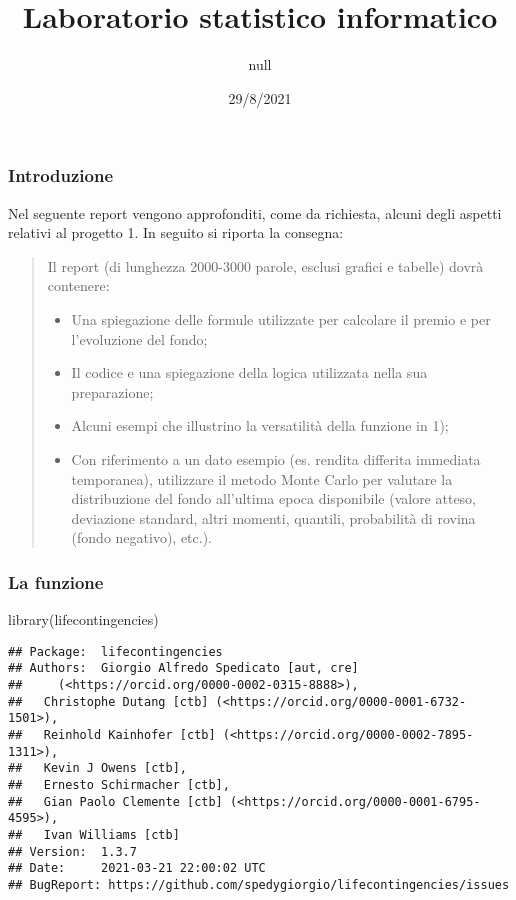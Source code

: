 \documentclass[
]{article}
\title{Laboratorio statistico informatico}
\author{null}
\date{29/8/2021}
\newenvironment{Shaded}{\begin{snugshade}}{\end{snugshade}}
\newcommand{\FunctionTok}[1]{\textcolor[rgb]{0.00,0.00,0.00}{#1}}
\newcommand{\NormalTok}[1]{#1}
\begin{document}
\maketitle

\hypertarget{introduzione}{%
\subsubsection{Introduzione}\label{introduzione}}

Nel seguente report vengono approfonditi, come da richiesta, alcuni
degli aspetti relativi al progetto 1. In seguito si riporta la consegna:

\begin{quote}
Il report (di lunghezza 2000-3000 parole, esclusi grafici e tabelle)
dovrà contenere:

\begin{itemize}
\item
  Una spiegazione delle formule utilizzate per calcolare il premio e per
  l'evoluzione del fondo;
\item
  Il codice e una spiegazione della logica utilizzata nella sua
  preparazione;
\item
  Alcuni esempi che illustrino la versatilità della funzione in 1);
\item
  Con riferimento a un dato esempio (es. rendita differita immediata
  temporanea), utilizzare il metodo Monte Carlo per valutare la
  distribuzione del fondo all'ultima epoca disponibile (valore atteso,
  deviazione standard, altri momenti, quantili, probabilità di rovina
  (fondo negativo), etc.).
\end{itemize}
\end{quote}

\hypertarget{la-funzione}{%
\subsubsection{La funzione}\label{la-funzione}}

\begin{Shaded}
\begin{Highlighting}[]
\FunctionTok{library}\NormalTok{(lifecontingencies)}
\end{Highlighting}
\end{Shaded}

\begin{verbatim}
## Package:  lifecontingencies
## Authors:  Giorgio Alfredo Spedicato [aut, cre]
##     (<https://orcid.org/0000-0002-0315-8888>),
##   Christophe Dutang [ctb] (<https://orcid.org/0000-0001-6732-1501>),
##   Reinhold Kainhofer [ctb] (<https://orcid.org/0000-0002-7895-1311>),
##   Kevin J Owens [ctb],
##   Ernesto Schirmacher [ctb],
##   Gian Paolo Clemente [ctb] (<https://orcid.org/0000-0001-6795-4595>),
##   Ivan Williams [ctb]
## Version:  1.3.7
## Date:     2021-03-21 22:00:02 UTC
## BugReport: https://github.com/spedygiorgio/lifecontingencies/issues
\end{verbatim}
\end{document}
